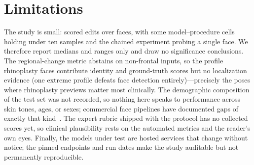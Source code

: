 \section{Limitations}
\label{sec:limitations}

The study is small: \NumScoredEdits{} scored edits over \NumFacesScored{} faces,
with some model--procedure cells holding under ten samples and the chained
experiment probing a single face. We therefore report medians and ranges only and
draw no significance conclusions. The regional-change metric abstains on
non-frontal inputs, so the profile rhinoplasty faces contribute identity and
ground-truth scores but no localization evidence (one extreme profile defeats
face detection entirely)---precisely the poses where rhinoplasty previews matter
most clinically. The demographic
composition of the test set was not recorded, so nothing here speaks to performance
across skin tones, ages, or sexes; commercial face pipelines have documented gaps
of exactly that kind~\cite{buolamwini2018gendershades}. The expert rubric shipped
with the protocol has no collected scores yet, so clinical plausibility rests on
the automated metrics and the reader's own eyes. Finally, the models under test
are hosted services that change without notice; the pinned endpoints and run dates
make the study auditable but not permanently reproducible.
